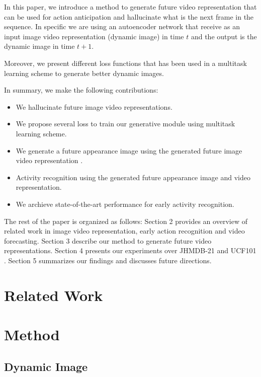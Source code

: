 \documentclass[10pt,twocolumn,letterpaper]{article}
\begin{document}
In this paper, we introduce a method to generate future video representation that can be used for action anticipation and hallucinate what is the next frame in the sequence. In specific we are using an autoencoder network that receive as an input image video representation (dynamic image) in time $t$ and  the output is the dynamic image in time $t+1$.

Moreover, we present different loss functions that has been used in a multitask learning scheme to generate better dynamic images.

In summary, we make the following contributions:
\begin{itemize}
 \item We hallucinate future image video representations. 
 \item We propose several loss to train our generative module using multitask learning scheme.
 \item We generate a future appearance image using the generated future image video representation .
 \item Activity recognition using the generated future appearance image and video representation.
 \item We archieve state-of-the-art performance for early activity recognition.
\end{itemize}

The rest of the paper is organized as follows: Section 2 provides an overview of related work in image video representation, early action recognition and video forecasting. Section 3 describe our method to generate future video representations. Section 4 presents our experiments over JHMDB-21 and UCF101 . Section 5 summarizes our findings and discusses future directions.

\section{Related Work}
\section{Method}
\subsection{Dynamic Image}
\end{document}
